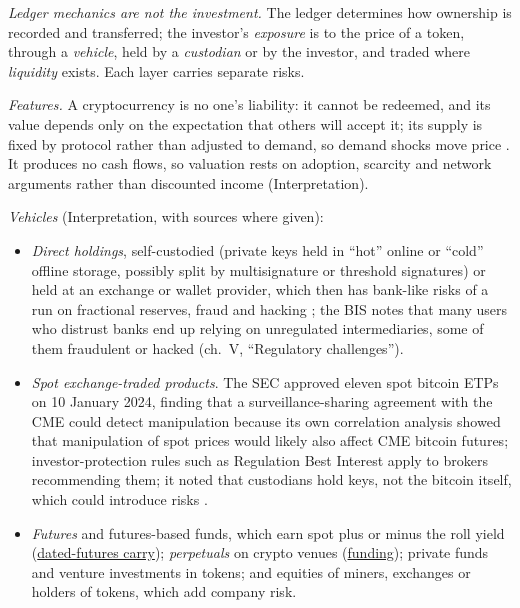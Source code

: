\begin{qfmethod}\label{meth:digital-asset-investment-analysis}
 \emph{Ledger mechanics are not the investment.} The ledger determines how ownership is recorded and transferred; the investor's \emph{exposure} is to the price of a token, through a \emph{vehicle}, held by a \emph{custodian} or by the investor, and traded where \emph{liquidity} exists. Each layer carries separate risks.

\emph{Features.} A cryptocurrency is no one's liability: it cannot be redeemed, and its value depends only on the expectation that others will accept it; its supply is fixed by protocol rather than adjusted to demand, so demand shocks move price \citep[ch.~V, ``A new petal in the money flower?'' and ``Assessing the economic limitations'']{bis-aer-2018-cryptocurrencies}. It produces no cash flows, so valuation rests on adoption, scarcity and network arguments rather than discounted income (Interpretation).

\emph{Vehicles} (Interpretation, with sources where given):
\begin{itemize}
\item \emph{Direct holdings}, self-custodied (private keys held in ``hot'' online or ``cold'' offline storage, possibly split by multisignature or threshold signatures) or held at an exchange or wallet provider, which then has bank-like risks of a run on fractional reserves, fraud and hacking \citep[draft of 9 February 2016, secs.~4.2--4.4, pp.~103--118]{crypto-narayanan}; the BIS notes that many users who distrust banks end up relying on unregulated intermediaries, some of them fraudulent or hacked (ch.~V, ``Regulatory challenges'').
\item \emph{Spot exchange-traded products}. The SEC approved eleven spot bitcoin ETPs on 10 January 2024, finding that a surveillance-sharing agreement with the CME could detect manipulation because its own correlation analysis showed that manipulation of spot prices would likely also affect CME bitcoin futures; investor-protection rules such as Regulation Best Interest apply to brokers recommending them; it noted that custodians hold keys, not the bitcoin itself, which could introduce risks \citep[89~FR 3008, 3009--3013]{sec-spot-bitcoin-etp-order-2024}.
\item \emph{Futures} and futures-based funds, which earn spot plus or minus the roll yield (\hyperref[ev:crypto-dated-futures-carry]{dated-futures carry}); \emph{perpetuals} on crypto venues (\hyperref[mech:perpetual-funding]{funding}); private funds and venture investments in tokens; and equities of miners, exchanges or holders of tokens, which add company risk.
\end{itemize}


\end{qfmethod}
